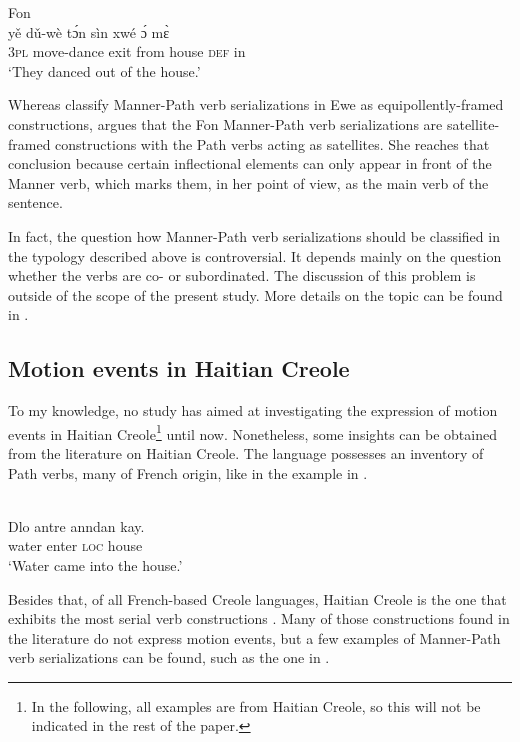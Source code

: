 \documentclass[output=paper,colorlinks,citecolor=brown]{langscibook}
\begin{document}
\ea\label{ex:3:17}Fon \citep[15]{LambertBrtire_2009}\\
\gll * yě dǔ-wè tɔ́n sìn xwé ɔ́ mɛ̀  \\
     {} \textsc{3pl} move-dance exit from house \textsc{def} in \\
\glt \phantom{*}‘They danced out of the house.’
\z

Whereas \citet[36]{Ameka_Essegbey_2013} classify Manner-Path verb serializations in Ewe as equipollently-framed constructions, \citet[19]{LambertBrtire_2009} argues that the Fon Manner-Path verb serializations are satellite-framed constructions with the Path verbs acting as satellites. She reaches that conclusion because certain inflectional elements can only appear in front of the Manner verb, which marks them, in her point of view, as the main verb of the sentence.

In fact, the question how Manner-Path verb serializations should be classified in the typology described above is controversial. It depends mainly on the question whether the verbs are co- or subordinated. The discussion of this problem is outside of the scope of the present study. More details on the topic can be found in \citet{Talmy_2009}.

\subsection{Motion events in Haitian Creole}
 
To my knowledge, no study has aimed at investigating the expression of motion events in Haitian Creole\footnote{In the following, all examples are from Haitian Creole, so this will not be indicated in the rest of the paper.} until now. Nonetheless, some insights can be obtained from the literature on Haitian Creole. The language possesses an inventory of Path verbs, many of French origin, like in the example in .

\ea\label{ex:3:18} \citep[203]{Fattier_2013}\\
\gll Dlo antre anndan kay. \\
     water enter \textsc{loc} house \\
\glt ‘Water came into the house.’
\z

Besides that, of all French-based Creole languages, Haitian Creole is the one that exhibits the most serial verb constructions \citep[44]{Mutz_2017}. Many of those constructions found in the literature do not express motion events, but a few examples of Manner-Path verb serializations can be found, such as the one in .
\end{document}
